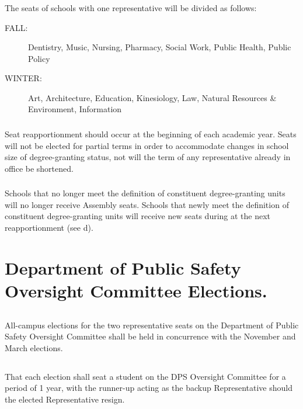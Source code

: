 \subsubsection{}
The seats of schools with one representative will be divided as follows:

\begin{description}
\item[FALL:] Dentistry, Music, Nursing, Pharmacy, Social Work, Public Health, Public Policy

\item[WINTER:] Art, Architecture, Education, Kinesiology, Law, Natural Resources \& Environment, Information
\end{description}

\subsubsection{}
Seat reapportionment should occur at the beginning of each academic year.  Seats will not be elected for partial terms in order to accommodate changes in school size of degree-granting status, not will the term of any representative already in office be shortened.

\subsubsection{}
Schools that no longer meet the definition of constituent degree-granting units will no longer receive Assembly seats.  Schools that newly meet the definition of constituent degree-granting units will receive new seats during at the next reapportionment (see d).

\section{Department of Public Safety Oversight Committee Elections.}

\subsection{}
All-campus elections for the two representative seats on the Department of Public Safety Oversight Committee shall be held in concurrence with the November and March elections.

\subsection{}
That each election shall seat a student on the DPS Oversight Committee for a period of 1 year, with the runner-up acting as the backup Representative should the elected Representative resign.

